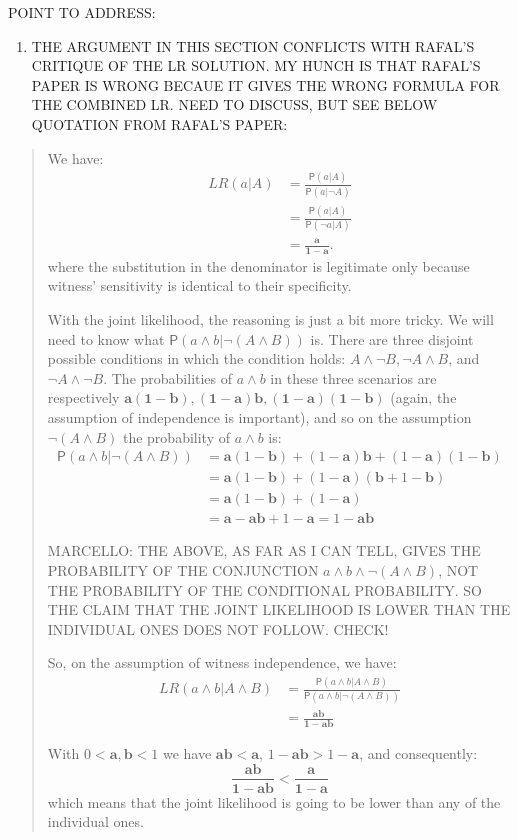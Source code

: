 \documentclass[10pt,dvipsnames,enabledeprecatedfontcommands]{scrartcl}
\providecommand{\tightlist}{%
  \setlength{\itemsep}{0pt}\setlength{\parskip}{0pt}}
\newcommand{\n}{\neg}
\newcommand{\et}{\wedge}
\newcommand{\pr}[1]{\mathsf{P}(#1)}
\begin{document}
POINT TO ADDRESS:

\begin{enumerate}
\def\labelenumi{(\arabic{enumi})}
\tightlist
\item
  THE ARGUMENT IN THIS SECTION CONFLICTS WITH RAFAL'S CRITIQUE OF THE LR
  SOLUTION. MY HUNCH IS THAT RAFAL'S PAPER IS WRONG BECAUE IT GIVES THE
  WRONG FORMULA FOR THE COMBINED LR. NEED TO DISCUSS, BUT SEE BELOW
  QUOTATION FROM RAFAL'S PAPER:
\end{enumerate}

\begin{quote}

We have: 
 \begin{align*}
 LR(a\vert A) & = \frac{\pr{a\vert A}}{\pr{a\vert \n A}}\\
 &= \frac{\pr{a\vert A}}{\pr{\n a\vert  A}} \\
& =  \frac{\mathbf{a}}{\mathbf{1-a}}.
\end{align*}
where the substitution in the denominator is legitimate only because witness' sensitivity is identical to their specificity. 


With the joint likelihood, the reasoning is just a bit more tricky. We will need to know what $\pr{a\et b \vert \n (A\et B)}$ is. There are three disjoint possible conditions in which the condition holds: $A\et \n B, \n A \et B$, and $\n A \et \n B$. The probabilities of $a\et b$ in these three scenarios are respectively $\mathbf{a(1-b),(1-a)b,(1-a)(1-b)}$ (again, the assumption of independence is important), and so on the assumption $\n(A\et B)$ the probability of $a\et b$ is:
\begin{align*}
\pr{a\et b \vert \n (A\et B)} & = 
\mathbf{a}(1-\mathbf{b})+(1-\mathbf{a})\mathbf{b}+(1-\mathbf{a})(1-\mathbf{b})\\ 
& = 
\mathbf{a}(1-\mathbf{b})+(1-\mathbf{a})(\mathbf{b} + 1-\mathbf{b})\\
& = \mathbf{a}(1-\mathbf{b})+(1-\mathbf{a})\\
& = \mathbf{a}-\mathbf{a}\mathbf{b}+1-\mathbf{a} = 1- \mathbf{a}\mathbf{b}
\end{align*}

MARCELLO: THE ABOVE, AS FAR AS I CAN TELL, GIVES THE PROBABILITY OF THE CONJUNCTION $a\et b \et \neg (A \et B)$,  NOT THE PROBABILITY OF THE CONDITIONAL PROBABILITY. SO THE CLAIM THAT THE JOINT LIKELIHOOD IS LOWER THAN THE INDIVIDUAL ONES DOES
NOT FOLLOW. CHECK!

So, on the assumption of witness independence, we have:
\begin{align*}
LR(a\et b \vert A \et B) & = \frac{\pr{a\et b \vert A \et B}}{\pr{a \et b\vert \n (A \et B)}} \\
& = \frac{\mathbf{ab}}{\mathbf{1-ab}}
\end{align*}

 With $0<\mathbf{a},\mathbf{b}<1$ we have $\mathbf{ab}<\mathbf{a}$, $1-\mathbf{ab}>1-\mathbf{a}$, and consequently:
 \[\frac{\mathbf{ab}}{\mathbf{1-ab}} < \frac{\mathbf{a}}{\mathbf{1-a}}\]
 which means that the joint likelihood is going to be lower than any of the individual ones.
\end{quote}
\end{document}
